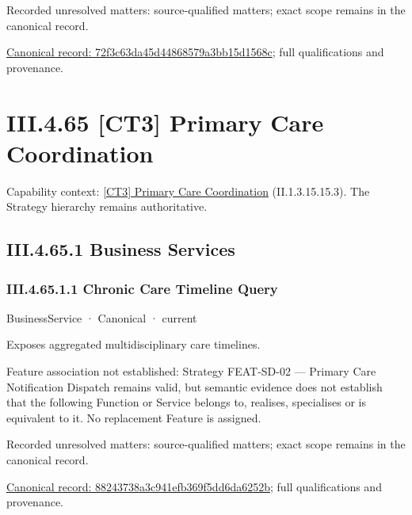 {\small Recorded unresolved matters: source-qualified matters; exact scope remains in the canonical record.}\par
{\footnotesize \href{../../../../continuum/business/business-process/72f3c63da45d44868579a3bb15d1568c.md}{Canonical record: 72f3c63da45d44868579a3bb15d1568c}; full qualifications and provenance.}\par
\section*{III.4.65 [CT3] Primary Care Coordination}
\label{navigation:III.4.65}

{\small Capability context: \hyperref[element:f80e73ee91624ce5baa11ae15480fd35]{[CT3] Primary Care Coordination} (II.1.3.15.15.3). The Strategy hierarchy remains authoritative.}\par
\subsection*{III.4.65.1 Business Services}
\label{navigation:III.4.65.1}

\subsubsection*{III.4.65.1.1 Chronic Care Timeline Query}
\label{navigation:III.4.65.1.1}

\label{element:88243738a3c941efb369f5dd6da6252b}
{\small BusinessService · Canonical · current}\par

Exposes aggregated multidisciplinary care timelines.



Feature association not established: Strategy FEAT-SD-02 — Primary Care Notification Dispatch remains valid, but semantic evidence does not establish that the following Function or Service belongs to, realises, specialises or is equivalent to it. No replacement Feature is assigned.


{\small Recorded unresolved matters: source-qualified matters; exact scope remains in the canonical record.}\par
{\footnotesize \href{../../../../continuum/business/business-service/88243738a3c941efb369f5dd6da6252b.md}{Canonical record: 88243738a3c941efb369f5dd6da6252b}; full qualifications and provenance.}\par
